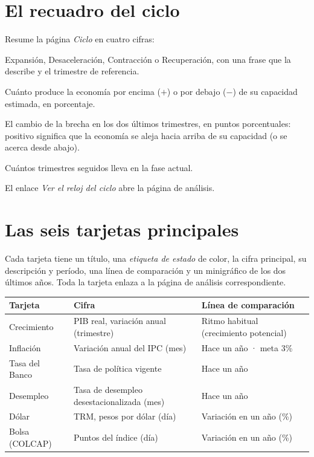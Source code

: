 \section{El recuadro del ciclo}
Resume la página \emph{Ciclo} en cuatro cifras:
\begin{description}[style=nextline,leftmargin=0pt]
\item[Fase] Expansión, Desaceleración, Contracción o Recuperación, con una frase que la describe y el
  trimestre de referencia.
\item[Brecha] Cuánto produce la economía por encima ($+$) o por debajo ($-$) de su capacidad estimada, en
  porcentaje.
\item[Dirección] El cambio de la brecha en los dos últimos trimestres, en puntos porcentuales: positivo
  significa que la economía se aleja hacia arriba de su capacidad (o se acerca desde abajo).
\item[Racha] Cuántos trimestres seguidos lleva en la fase actual.
\end{description}
El enlace \emph{Ver el reloj del ciclo} abre la página de análisis.

\section{Las seis tarjetas principales}
Cada tarjeta tiene un título, una \emph{etiqueta de estado} de color, la cifra principal, su descripción y
período, una línea de comparación y un minigráfico de los dos últimos años. Toda la tarjeta enlaza a la página
de análisis correspondiente.

\begin{center}\small
\begin{tabularx}{\linewidth}{@{}lXX@{}}
\toprule
\textbf{Tarjeta} & \textbf{Cifra} & \textbf{Línea de comparación}\\\midrule
Crecimiento & PIB real, variación anual (trimestre) & Ritmo habitual (crecimiento potencial)\\
Inflación & Variación anual del IPC (mes) & Hace un año · meta 3\%\\
Tasa del Banco & Tasa de política vigente & Hace un año\\
Desempleo & Tasa de desempleo desestacionalizada (mes) & Hace un año\\
Dólar & TRM, pesos por dólar (día) & Variación en un año (\%)\\
Bolsa (COLCAP) & Puntos del índice (día) & Variación en un año (\%)\\
\bottomrule
\end{tabularx}
\end{center}


